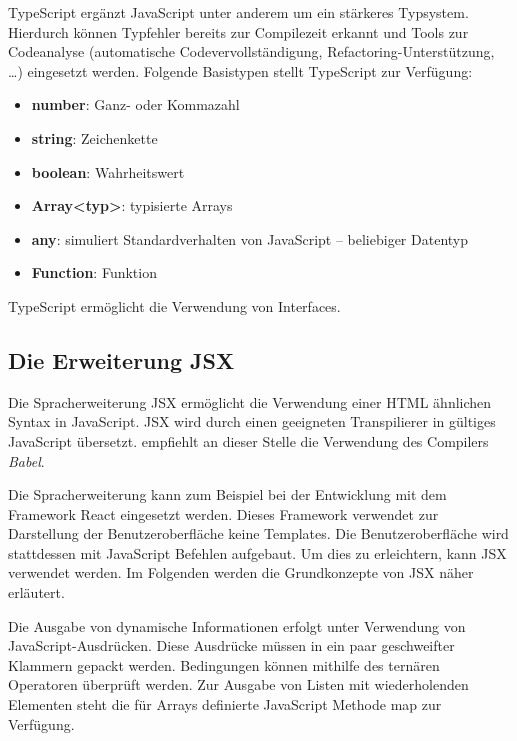 TypeScript ergänzt JavaScript unter anderem um ein stärkeres Typsystem. Hierdurch können Typfehler bereits zur Compilezeit erkannt und Tools zur Codeanalyse (automatische Codevervollständigung, Refactoring-Unterstützung, …) eingesetzt werden.\autocites[vgl.][27\psqq]{Woiwode.2018}[vgl.][13\psqq]{Steyer.2017}[vgl.][10]{Zeigermann.2016} Folgende Basistypen stellt TypeScript zur Verfügung: \autocites[vgl.][34\psqq]{Woiwode.2018}[vgl.][16\psqq]{Steyer.2017}

\begin{itemize}
	\item  \textbf{number}: Ganz- oder Kommazahl
	\item \textbf{string}:  Zeichenkette
	\item \textbf{boolean}: Wahrheitswert
	\item \textbf{Array<typ>}: typisierte Arrays
	\item \textbf{any}: simuliert Standardverhalten von JavaScript  – beliebiger Datentyp
	\item \textbf{Function}: Funktion
\end{itemize}
TypeScript ermöglicht die Verwendung von Interfaces. \autocites[vgl.][40\psq]{Woiwode.2018}

\subsection{Die Erweiterung JSX}\label{sec:die-erweiterung-jsx}
\label{Babel}
Die Spracherweiterung JSX ermöglicht die Verwendung einer HTML ähnlichen Syntax in JavaScript. JSX wird durch einen geeigneten Transpilierer in gültiges JavaScript übersetzt.\textcite[vgl.][10]{Zeigermann.2016} empfiehlt an dieser Stelle die Verwendung des Compilers \textit{Babel}.

Die Spracherweiterung kann zum Beispiel bei der Entwicklung mit dem Framework React eingesetzt werden. Dieses Framework verwendet zur Darstellung der Benutzeroberfläche keine Templates. Die Benutzeroberfläche wird stattdessen mit JavaScript Befehlen aufgebaut. Um dies zu erleichtern, kann JSX verwendet werden. Im Folgenden werden die Grundkonzepte von JSX näher erläutert.

Die Ausgabe von dynamische Informationen erfolgt unter Verwendung von JavaScript-Ausdrücken. Diese Ausdrücke müssen in ein paar geschweifter Klammern gepackt werden. Bedingungen können mithilfe des ternären Operatoren überprüft werden. Zur Ausgabe von Listen mit wiederholenden Elementen steht die für Arrays definierte JavaScript Methode map zur Verfügung.

